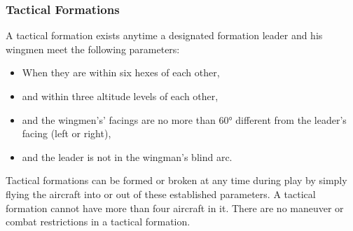 \subsubsection{Tactical Formations}

A tactical formation exists anytime a designated formation leader and his wingmen meet the following parameters:

\begin{itemize}
    \item When they are within six hexes of each other,
    \item and within three altitude levels of each other,
    \item and the wingmen’s' facings are no more than 60° different from the leader's facing (left or right),
    \item and the leader is not in the wingman's blind arc.
\end{itemize}

Tactical formations can be formed or broken at any time during play by simply flying the aircraft into or out of these established parameters. A tactical formation cannot have more than four aircraft in it. There are no maneuver or combat restrictions in a tactical formation.
